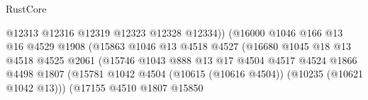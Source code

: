 \begin{lexlean}{RustCore}
\begin{coremodule}
                                                  @12313
                                                  @12316
                                                  @12319
                                                  @12323
                                                  @12328
                                                  @12334))
                                              (@16000
                                                @1046
                                                @166
                                                @13
                                                @16
                                                @4529
                                                @1908
                                                (@15863
                                                  @1046
                                                  @13
                                                  @4518
                                                  @4527
                                                  (@16680
                                                    @1045
                                                    @18
                                                    @13
                                                    @4518
                                                    @4525
                                                    @2061
                                                    (@15746
                                                      @1043
                                                      @888
                                                      @13
                                                      @17
                                                      @4504
                                                      @4517
                                                      @4524
                                                      @1866
                                                      @4498
                                                      @1807
                                                      (@15781
                                                        @1042
                                                        @4504
                                                        (@10615 (@10616 @4504))
                                                        (@10235 (@10621 @1042 @13)))
                                                      (@17155
                                                        @4510
                                                        @1807
                                                        @15850

\end{coremodule}
\end{lexlean}
